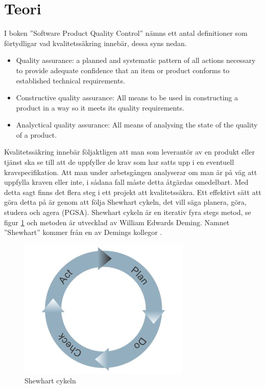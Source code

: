 \section{Teori}
I boken ''Software Product Quality Control'' \cite{SPQC} nämns ett antal definitioner som förtydligar vad kvalitetssäkring innebär, dessa syns nedan.  

\begin{itemize}
  \item Quality assurance: a planned and systematic pattern of all actions necessary to provide adequate confidence that an item or product conforms to established technical requirements. 
  \item Constructive quality assurance: All means to be used in constructing a product in a way so it meets its quality requirements. 
  \item Analyctical quality assurance: All means of analysing the state of the quality of a product. 
\end{itemize}
\noindent Kvalitetssäkring innebär följaktligen att man som leverantör av en produkt eller tjänst ska se till att de uppfyller de krav som har satts upp i en eventuell kravspecifikation. Att man under arbetsgången analyserar om man är på väg att uppfylla kraven eller inte, i sådana fall måste detta åtgärdas omedelbart.
\newline
\newline
Med detta sagt finns det flera steg i ett projekt att kvalitetssäkra. Ett effektivt sätt att göra detta på är genom att följa Shewhart cykeln, det vill säga planera, göra, studera och agera (PGSA). Shewhart cykeln är en iterativ fyra stegs metod, se figur \ref{fig:shewcycle} och metoden är utvecklad av William Edwards Deming. Namnet ''Shewhart'' kommer från en av Demings kollegor \cite[p.~88]{Deming}. 
\begin{figure}[h]
\centerline{\includegraphics[scale=0.5]{ruben-tex/graphic/shewhartcycle}}
\caption{Shewhart cykeln}
\label{fig:shewcycle}
\end{figure}
